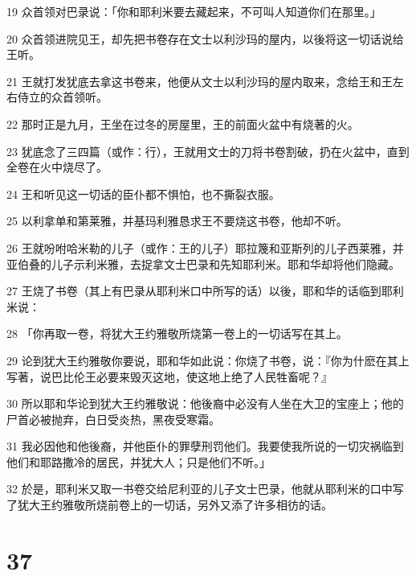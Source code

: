 \par 19 众首领对巴录说：「你和耶利米要去藏起来，不可叫人知道你们在那里。」
\par 20 众首领进院见王，却先把书卷存在文士以利沙玛的屋内，以後将这一切话说给王听。
\par 21 王就打发犹底去拿这书卷来，他便从文士以利沙玛的屋内取来，念给王和王左右侍立的众首领听。
\par 22 那时正是九月，王坐在过冬的房屋里，王的前面火盆中有烧著的火。
\par 23 犹底念了三四篇（或作：行），王就用文士的刀将书卷割破，扔在火盆中，直到全卷在火中烧尽了。
\par 24 王和听见这一切话的臣仆都不惧怕，也不撕裂衣服。
\par 25 以利拿单和第莱雅，并基玛利雅恳求王不要烧这书卷，他却不听。
\par 26 王就吩咐哈米勒的儿子（或作：王的儿子）耶拉篾和亚斯列的儿子西莱雅，并亚伯叠的儿子示利米雅，去捉拿文士巴录和先知耶利米。耶和华却将他们隐藏。
\par 27 王烧了书卷（其上有巴录从耶利米口中所写的话）以後，耶和华的话临到耶利米说：
\par 28 「你再取一卷，将犹大王约雅敬所烧第一卷上的一切话写在其上。
\par 29 论到犹大王约雅敬你要说，耶和华如此说：你烧了书卷，说：『你为什麽在其上写著，说巴比伦王必要来毁灭这地，使这地上绝了人民牲畜呢？』
\par 30 所以耶和华论到犹大王约雅敬说：他後裔中必没有人坐在大卫的宝座上；他的尸首必被抛弃，白日受炎热，黑夜受寒霜。
\par 31 我必因他和他後裔，并他臣仆的罪孽刑罚他们。我要使我所说的一切灾祸临到他们和耶路撒冷的居民，并犹大人；只是他们不听。」
\par 32 於是，耶利米又取一书卷交给尼利亚的儿子文士巴录，他就从耶利米的口中写了犹大王约雅敬所烧前卷上的一切话，另外又添了许多相彷的话。

\chapter{37}

